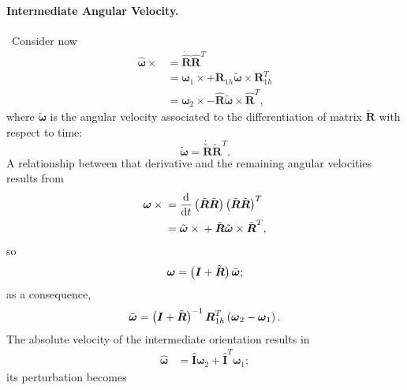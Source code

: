 \documentclass[10pt,dvips,fleqn]{report}
\newcommand{\T}[1]{\boldsymbol{#1}}
\newcommand{\TT}[1]{\boldsymbol{#1}}
\begin{document}
\paragraph{Intermediate Angular Velocity.} \
Consider now
\begin{align}
	\hat{\T{\omega}}\times{}
	&= \dot{\hat{\T{R}}} \hat{\T{R}}^T \\
	&= \T{\omega}_{1} \times
		+ \T{R}_{1h} \tilde{\T{\omega}}\times \T{R}_{1h}^T \\
	&= \T{\omega}_{2} \times
		- \hat{\T{R}} \tilde{\T{\omega}}\times \hat{\T{R}}^T ,
\end{align}
where $\tilde{\T{\omega}}$ is the angular velocity associated
to the differentiation of matrix $\tilde{\T{R}}$ with respect to time:
\begin{equation}
	\tilde{\T{\omega}}
	= \dot{\tilde{\T{R}}} \tilde{\T{R}}^T .
\end{equation}
A relationship between that derivative and the remaining angular velocities
results from
\begin{align}
	\T{\omega} \times{}
	&= \frac{\mathrm{d}}{\mathrm{d}t}\plbr{
		\tilde{\T{R}} \tilde{\T{R}}
	} \plbr{
		\tilde{\T{R}} \tilde{\T{R}}
	}^T \\
	&= \tilde{\T{\omega}} \times{}
	+ \tilde{\T{R}} \tilde{\T{\omega}} \times \tilde{\T{R}}^T ,
\end{align}
so
\begin{equation}
	\T{\omega} = \plbr{\T{I} + \tilde{\T{R}}} \tilde{\T{\omega}} ;
\end{equation}
as a consequence,
\begin{equation}
	\tilde{\T{\omega}}
	= \plbr{\T{I} + \tilde{\T{R}}}^{-1} \T{R}_{1h}^T \plbr{
		\T{\omega}_2 - \T{\omega}_1
	} .
\end{equation}
The absolute velocity of the intermediate orientation results in
\begin{align}
	\hat{\T{\omega}}
	&= \hat{\TT{I}} \T{\omega}_2
	+ \hat{\TT{I}}^T \T{\omega}_1 ;
	\label{eq:deformable-displacement-invariant-hat-omega}
\end{align}
its perturbation becomes
\end{document}
